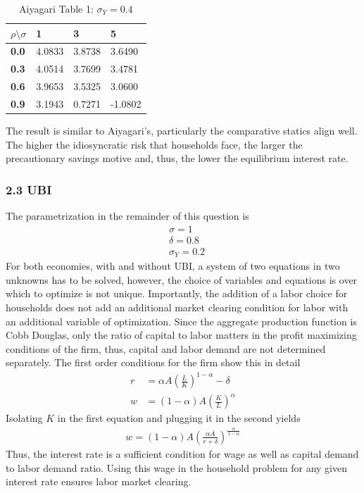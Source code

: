 \documentclass[letterpaper,12pt]{article}
\begin{document}
\begin{table}
\begin{tabular}{llll}
\textbf{$\rho \setminus \sigma$} & \textbf{1} & \textbf{3} & \textbf{5} \\ \hline
\textbf{0.0}      & 4.0833       & 3.8738         & 3.6490        \\
\textbf{0.3}      & 4.0514       & 3.7699         & 3.4781        \\
\textbf{0.6}      & 3.9653       & 3.5325         & 3.0600        \\
\textbf{0.9}      & 3.1943       & 0.7271         & -1.0802       
\end{tabular}
\caption{Aiyagari Table 1: $\sigma_Y = 0.4$}
\end{table}

The result is similar to Aiyagari's, particularly the comparative statics align well. The higher the idiosyncratic risk that households face, the larger the precautionary savings motive and, thus, the lower the equilibrium interest rate.







\subsubsection*{2.3 UBI}
The parametrization in the remainder of this question is 
\begin{align*}
&\sigma = 1 \\
&\delta = 0.8 \\
&\sigma_Y = 0.2
\end{align*}
For both economies, with and without UBI, a system of two equations in two unknowns has to be solved, however, the choice of variables and equations is over which to optimize is not unique. Importantly, the addition of a labor choice for households does not add an additional market clearing condition for labor with an additional variable of optimization. Since the aggregate production function is Cobb Douglas, only the ratio of capital to labor matters in the profit maximizing conditions of the firm, thus, capital and labor demand are not determined separately. The first order conditions for the firm show this in detail
\begin{align*}
r &= \alpha A \left( \frac{L}{K} \right)^{1-\alpha} - \delta \\
w &= \left( 1-\alpha \right) A \left( \frac{K}{L} \right)^\alpha 
\end{align*}
Isolating $K$ in the first equation and plugging it in the second yields
\begin{align*}
w = \left( 1-\alpha \right) A \left( \frac{\alpha A}{r + \delta} \right)^{\frac{\alpha}{1-\alpha}}
\end{align*}
Thus, the interest rate is a sufficient condition for wage as well as capital demand to labor demand ratio. Using this wage in the household problem for any given interest rate ensures labor market clearing. 
\end{document}
